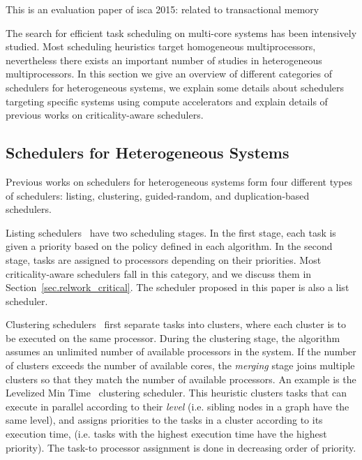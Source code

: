 \iffalse
This is an evaluation paper of isca 2015: \cite{Nakaike:isca} related to transactional memory

The search for efficient task scheduling on multi-core systems has been intensively studied. Most scheduling heuristics target homogeneous multiprocessors, nevertheless there exists an important number of studies in heterogeneous multiprocessors. In this section we give an overview of different categories of schedulers for heterogeneous systems, we explain some details about schedulers targeting specific systems using compute accelerators and explain details of previous works on criticality-aware schedulers.


\subsection{Schedulers for Heterogeneous Systems}

Previous works on schedulers for heterogeneous systems form four different types of schedulers: listing, clustering, guided-random, and duplication-based schedulers.


Listing schedulers~\cite{List, DCPS, LDCP, HEFT, CrPathDup} have two scheduling stages. In the first stage, each task is given a priority based on the policy defined in each algorithm. In the second stage, tasks are assigned to processors depending on their priorities. Most criticality-aware schedulers fall in this category, and we discuss them in Section~\ref{sec.relwork_critical}. The scheduler proposed in this paper is also a list scheduler.

Clustering schedulers~\cite{Hypertool, DSC, DCPS, Hetero95} first separate tasks into clusters, where each cluster is to be executed on the same processor. During the clustering stage, the algorithm assumes an unlimited number of available processors in the system. If the number of clusters exceeds the number of available cores, the \textit{merging} stage joins multiple clusters so that they match the number of available processors. An example is the Levelized Min Time~\cite{Hetero95} clustering scheduler. This heuristic clusters tasks that can execute in parallel according to their \textit{level} (i.e. sibling nodes in a graph have the same level), and assigns priorities to the tasks in a cluster according to its execution time, (i.e. tasks with the highest execution time have the highest priority). The task-to processor assignment is done in decreasing order of priority.

